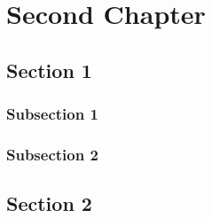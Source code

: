 \chapter{Second Chapter}\label{chap:conclusion}
\setcounter{minitocdepth}{1}
\minitoc

\lipsum[22]

\section{Section 1}
\lipsum[30]
	\subsection{Subsection 1}
		\lipsum[31]
	\subsection{Subsection 2}
	\lipsum[32]
\section{Section 2}
\lipsum[34]

